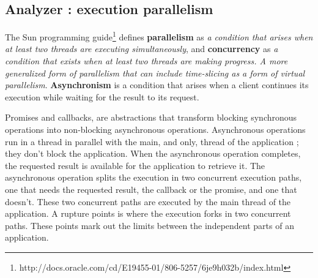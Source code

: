 
\subsection{Analyzer : execution parallelism} \label{section:analyzer}

The Sun programming guide\footnote{\raggedright http://docs.oracle.com/cd/E19455-01/806-5257/6je9h032b/index.html} defines \textbf{parallelism} as \textit{a condition that arises when at least two threads are executing simultaneously}, and \textbf{concurrency} as \textit{a condition that exists when at least two threads are making progress. A more generalized form of parallelism that can include time-slicing as a form of virtual parallelism}.
\textbf{Asynchronism} is a condition that arises when a client continues its execution while waiting for the result to its request.

Promises\cite{Liskov1988} and callbacks, are abstractions that transform blocking synchronous operations into non-blocking asynchronous operations.
Asynchronous operations run in a thread in parallel with the main, and only, thread of the application ; they don't block the application.
When the asynchronous operation completes, the requested result is available for the application to retrieve it.
The asynchronous operation splits the execution in two concurrent execution paths, one that needs the requested result, the callback or the promise, and one that doesn't.
These two concurrent paths are executed by the main thread of the application.
A rupture points is where the execution forks in two concurrent paths.
These points mark out the limits between the independent parts of an application.
 
